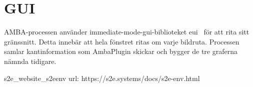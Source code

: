 

\section{GUI}
AMBA-processen använder immediate-mode-gui-biblioteket eui~\cite{egui} för att rita sitt gränssnitt. Detta innebär att hela fönstret ritas om varje bildruta.
Processen samlar kantinformation som AmbaPlugin skickar och bygger de tre graferna nämnda tidigare.

%






s2e_website_s2eenv  url: https://s2e.systems/docs/s2e-env.html
